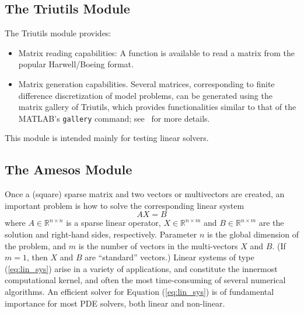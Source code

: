\documentclass[acmtocl]{acmtrans2m}
\begin{document}
\subsection{The Triutils Module}
\label{subsec:triutils}

The Triutils module provides:

\begin{itemize}

\item Matrix reading capabilities: A function is available to read a
  matrix from the popular Harwell/Boeing format.

\item Matrix generation capabilities. Several matrices, corresponding
  to finite difference discretization of model problems, can be
  generated using the matrix gallery of Triutils, which provides
  functionalities similar to that of the MATLAB's {\tt gallery}
  command; see~\cite[Chapter 5]{Trilinos-tutorial} for more details.

\end{itemize}

This module is intended mainly for testing linear solvers.

\subsection{The Amesos Module}
\label{subsec:amesos}

Once a (square) sparse matrix and two vectors or multivectors are
created, an important problem is how to solve the corresponding linear
system
\begin{equation}
  \label{eq:lin_sys}
  A X = B
\end{equation}
where $A \in \mathbb{R}^{n \times n}$ is a sparse linear operator, $X
\in \mathbb{R}^{n \times m}$ and $B \in \mathbb{R}^{n \times m}$ are
the solution and right-hand sides, respectively. Parameter $n$ is the
global dimension of the problem, and $m$ is the number of vectors in
the multi-vectors $X$ and $B$.  (If $m = 1$, then $X$ and $B$ are
``standard'' vectors.)  Linear systems of type (\ref{eq:lin_sys})
arise in a variety of applications, and constitute the innermost
computational kernel, and often the most time-consuming of several
numerical algorithms. An efficient solver for Equation
(\ref{eq:lin_sys}) is of fundamental importance for most PDE solvers,
both linear and non-linear.
\end{document}
